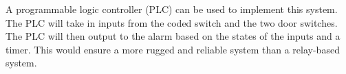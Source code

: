 \documentclass{article}
\begin{document}
A programmable logic controller (PLC) can be used to implement this system. The PLC will take in inputs from the coded switch and the two door switches. The PLC will then output to the alarm based on the states of the inputs and a timer. This would ensure a more rugged and reliable system than a relay-based system.

\end{document}
